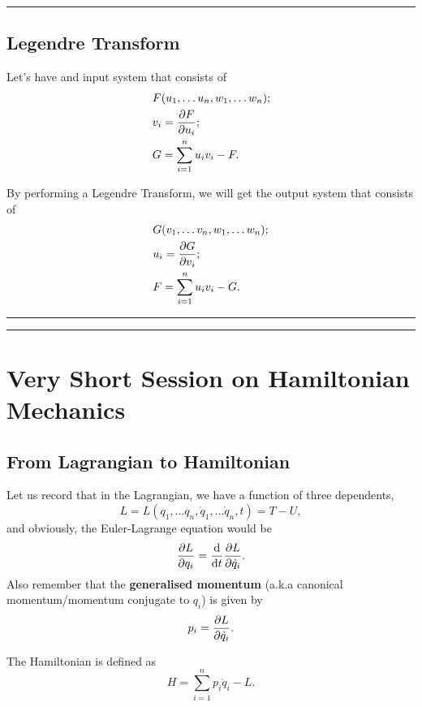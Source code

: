 \documentclass[a4paper]{article}
\numberwithin{equation}{subsection}
\begin{document}
\par\noindent\rule{\textwidth}{0.4pt}
\subsection{Legendre Transform}
Let's have and input system that consists of 
\begin{align*}
    &F(u_1, \dots u_n, w_1, \dots w_n);\\
    &v_i = \pdv{F}{u_i};\\
    &G = \sum_{i = 1}^{n} u_i v_i - F.
\end{align*}

By performing a Legendre Transform, we will get the output system that consists of 
\begin{align*}
    &G(v_1, \dots v_n, w_1, \dots w_n);\\
    &u_i = \pdv{G}{v_i};\\
    &F = \sum_{i = 1}^{n} u_i v_i - G.
\end{align*}
\par\noindent\rule{\textwidth}{0.4pt}
\par\noindent\rule{\textwidth}{0.4pt}


\section{Very Short Session on Hamiltonian Mechanics}
\subsection{From Lagrangian to Hamiltonian}
Let us record that in the Lagrangian, we have a function of three dependents,
\begin{equation}
    L = L(q_1, \dots q_n, \dot{q}_1, \dots \dot{q}_n, t) = T - U,
\end{equation}
and obviously, the Euler-Lagrange equation would be
\begin{equation}
    \pdv{L}{q_i} = \dv{t}\pdv{L}{\dot{q}_i}.
\end{equation}
Also remember that the \textbf{generalised momentum} (a.k.a canonical momentum/momentum conjugate to $q_i$) is given by 
\begin{equation}
    p_i = \pdv{L}{\dot{q}_i}.
\end{equation}

The Hamiltonian is defined as
\begin{equation}
    H = \sum_{i = 1}^{n} p_i \dot{q}_i - L.
\end{equation}
\end{document}
